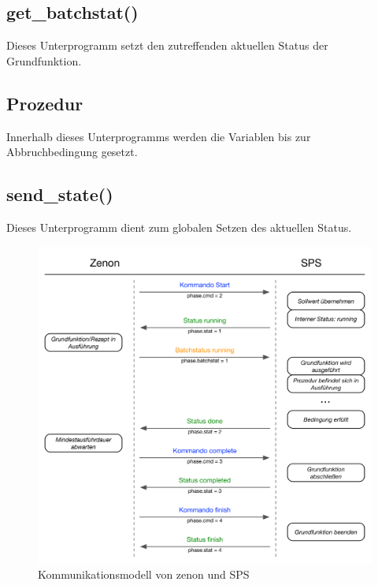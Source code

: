 	

	\subsection{get\_batchstat()}
	Dieses Unterprogramm setzt den zutreffenden aktuellen Status der Grundfunktion.
	
	

	\subsection{Prozedur}
	Innerhalb dieses Unterprogramms werden die Variablen bis zur Abbruchbedingung gesetzt.
	
	

	\subsection{send\_state()}
	Dieses Unterprogramm dient zum globalen Setzen des aktuellen Status.
	
	
		
\begin{figure}[h!]
  \centering
  \includegraphics[width=1\textwidth]{graphics/implementation/StateMachine.jpg}
  \caption{Kommunikationsmodell von zenon und SPS}
  \label{fig:statemachine}
\end{figure}

